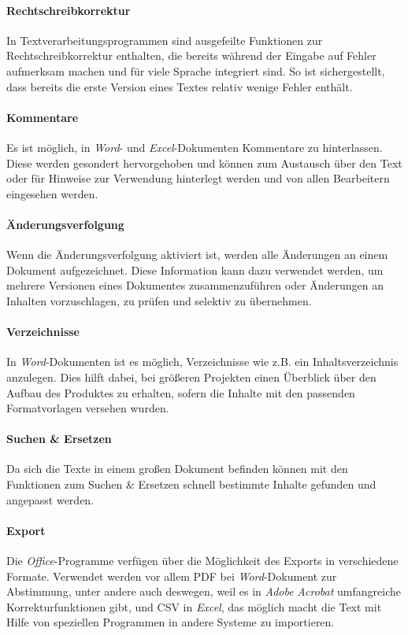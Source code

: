 \paragraph{Rechtschreibkorrektur} In Textverarbeitungsprogrammen sind ausgefeilte Funktionen zur Rechtschreibkorrektur enthalten, die bereits während der Eingabe auf Fehler aufmerksam machen und für viele Sprache integriert sind. So ist sichergestellt, dass bereits die erste Version eines Textes relativ wenige Fehler enthält.

\paragraph{Kommentare} Es ist möglich, in \emph{Word}- und \emph{Excel}-Dokumenten Kommentare zu hinterlassen. Diese werden gesondert hervorgehoben und können zum Austausch über den Text oder für Hinweise zur Verwendung hinterlegt werden und von allen Bearbeitern eingesehen werden.

\paragraph{Änderungsverfolgung} Wenn die Änderungsverfolgung aktiviert ist, werden alle Änderungen an einem Dokument aufgezeichnet. Diese Information kann dazu verwendet werden, um mehrere Versionen eines Dokumentes zusammenzuführen oder Änderungen an Inhalten vorzuschlagen, zu prüfen und selektiv zu übernehmen.

\paragraph{Verzeichnisse} In \emph{Word}-Dokumenten ist es möglich, Verzeichnisse wie z.B. ein Inhaltsverzeichnis anzulegen. Dies hilft dabei, bei größeren Projekten einen Überblick über den Aufbau des Produktes zu erhalten, sofern die Inhalte mit den passenden Formatvorlagen versehen wurden.

\paragraph{Suchen \& Ersetzen} Da sich die Texte in einem großen Dokument befinden können mit den Funktionen zum Suchen \& Ersetzen schnell bestimmte Inhalte gefunden und angepasst werden.

\paragraph{Export} Die \emph{Office}-Programme verfügen über die Möglichkeit des Exports in verschiedene Formate. Verwendet werden vor allem PDF bei \emph{Word}-Dokument zur Abstimmung, unter andere auch deswegen, weil es in \emph{Adobe} \emph{Acrobat} umfangreiche Korrekturfunktionen gibt, und CSV in \emph{Excel}, das möglich macht die Text mit Hilfe von speziellen Programmen in andere Systeme zu importieren.

